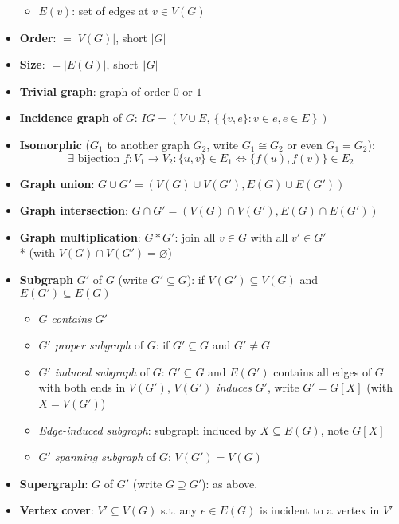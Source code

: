 \begin{itemize}
\begin{itemize}
    \item $ E(v) $: set of edges at $ v \in V(G) $
  \end{itemize}
  \item \textbf{Order}: $ = \vert V(G) \vert $, short $ \vert G \vert $
  \item \textbf{Size}: $ = \vert E(G) \vert $, short $ \Vert G \Vert $
  \item \textbf{Trivial graph}: graph of order $ 0 $ or $ 1 $
  \item \textbf{Incidence graph} of $ G $: $ IG = (V \cup E, \left\{ \{ v,e \} : v \in e, e \in E \right\}) $
  \item \textbf{Isomorphic} ($ G_1 $ to another graph $ G_2 $, write $ G_1 \cong G_2 $ or even $ G_1 = G_2 $):
    \begin{equation*}
      \exists \text{ bijection } f: V_1 \to V_2 : \{ u,v \} \in E_1 \Leftrightarrow \{ f(u),f(v) \} \in E_2
    \end{equation*}
  \item \textbf{Graph union}: $ G \cup G' = (V(G) \cup V(G'), E(G) \cup E(G')) $
  \item \textbf{Graph intersection}: $ G \cap G' = (V(G) \cap V(G'), E(G) \cap E(G')) $
  \item \textbf{Graph multiplication}: $ G * G' $: join all $ v \in G $ with all $ v' \in G' $ \\* (with $ V(G) \cap V(G') = \varnothing $)
  \item \textbf{Subgraph} $ G' $ of $ G $ (write $ G' \subseteq G $): if $ V(G') \subseteq V(G) $ and $ E(G') \subseteq E(G) $
  \begin{itemize}
    \item $ G $ \emph{contains} $ G' $ 
    \item $ G' $ \emph{proper subgraph} of $ G $: if $ G' \subseteq G $ and $ G' \neq G $
    \item $ G' $ \emph{induced subgraph} of $ G $: $ G' \subseteq G $ and $ E(G') $ contains all edges of $ G $ with both ends in $ V(G') $, $ V(G') $ \emph{induces} $ G' $, write $ G' = G[X] $ (with $ X = V(G') $)
    \item \emph{Edge-induced subgraph}: subgraph induced by $ X \subseteq E(G) $, note $ G[X] $
    \item $ G' $ \emph{spanning subgraph} of $ G $: $ V(G') = V(G) $
  \end{itemize}
  \item \textbf{Supergraph}: $ G $ of $ G' $ (write $ G \supseteq G' $): as above.
  \item \textbf{Vertex cover}: $ V' \subseteq V(G) $ s.t. any $ e \in E(G) $ is incident to a vertex in $ V' $ 

\end{itemize}
